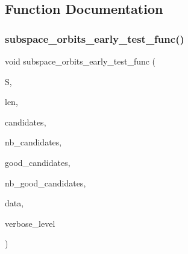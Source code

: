 \subsection{Function Documentation}
\mbox{\label{subspace__orbits_8_c_abd507fb4877a2bb112f530ba9585c900}} 
\subsubsection{\texorpdfstring{subspace\+\_\+orbits\+\_\+early\+\_\+test\+\_\+func()}{subspace\_orbits\_early\_test\_func()}}
{\footnotesize\ttfamily void subspace\+\_\+orbits\+\_\+early\+\_\+test\+\_\+func (\begin{DoxyParamCaption}\item[{\mbox{\hyperlink{galois_8h_a09fddde158a3a20bd2dcadb609de11dc}{I\+NT}} $\ast$}]{S,  }\item[{\mbox{\hyperlink{galois_8h_a09fddde158a3a20bd2dcadb609de11dc}{I\+NT}}}]{len,  }\item[{\mbox{\hyperlink{galois_8h_a09fddde158a3a20bd2dcadb609de11dc}{I\+NT}} $\ast$}]{candidates,  }\item[{\mbox{\hyperlink{galois_8h_a09fddde158a3a20bd2dcadb609de11dc}{I\+NT}}}]{nb\+\_\+candidates,  }\item[{\mbox{\hyperlink{galois_8h_a09fddde158a3a20bd2dcadb609de11dc}{I\+NT}} $\ast$}]{good\+\_\+candidates,  }\item[{\mbox{\hyperlink{galois_8h_a09fddde158a3a20bd2dcadb609de11dc}{I\+NT}} \&}]{nb\+\_\+good\+\_\+candidates,  }\item[{void $\ast$}]{data,  }\item[{\mbox{\hyperlink{galois_8h_a09fddde158a3a20bd2dcadb609de11dc}{I\+NT}}}]{verbose\+\_\+level }\end{DoxyParamCaption})}

\mbox{\label{subspace__orbits_8_c_afdf4004854a2e254a5a4ea79313b702c}} 

